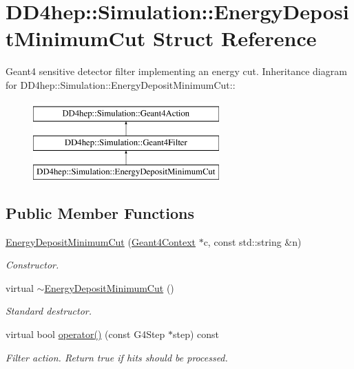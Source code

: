 \hypertarget{struct_d_d4hep_1_1_simulation_1_1_energy_deposit_minimum_cut}{
\section{DD4hep::Simulation::EnergyDepositMinimumCut Struct Reference}
\label{struct_d_d4hep_1_1_simulation_1_1_energy_deposit_minimum_cut}
}


Geant4 sensitive detector filter implementing an energy cut.  
Inheritance diagram for DD4hep::Simulation::EnergyDepositMinimumCut::\begin{figure}[H]
\begin{center}
\leavevmode
\includegraphics[height=3cm]{struct_d_d4hep_1_1_simulation_1_1_energy_deposit_minimum_cut}
\end{center}
\end{figure}
\subsection*{Public Member Functions}
\begin{DoxyCompactItemize}
\item 
\hyperlink{struct_d_d4hep_1_1_simulation_1_1_energy_deposit_minimum_cut_a5abe4000163bf6533035fc26ebfb8642}{EnergyDepositMinimumCut} (\hyperlink{class_d_d4hep_1_1_simulation_1_1_geant4_context}{Geant4Context} $\ast$c, const std::string \&n)
\begin{DoxyCompactList}\small\item\em Constructor. \item\end{DoxyCompactList}\item 
virtual \hyperlink{struct_d_d4hep_1_1_simulation_1_1_energy_deposit_minimum_cut_a808a2e16dfa18be72f189409484fe50d}{$\sim$EnergyDepositMinimumCut} ()
\begin{DoxyCompactList}\small\item\em Standard destructor. \item\end{DoxyCompactList}\item 
virtual bool \hyperlink{struct_d_d4hep_1_1_simulation_1_1_energy_deposit_minimum_cut_a1ab9fdb187f848cbf70d15871188fe94}{operator()} (const G4Step $\ast$step) const 
\begin{DoxyCompactList}\small\item\em Filter action. Return true if hits should be processed. \item\end{DoxyCompactList}\end{DoxyCompactItemize}
